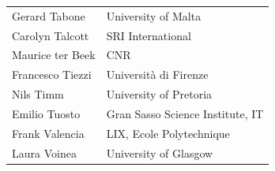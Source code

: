 \documentclass[]{llncs}
\begin{document}
\begin{longtable}{p{}p{}}
Gerard Tabone & University of Malta\\

Carolyn Talcott & SRI  International\\

Maurice ter Beek & CNR\\

Francesco Tiezzi & Universit\`a di Firenze\\

Nils Timm & University of Pretoria\\

Emilio Tuosto & Gran Sasso Science Institute, IT\\

Frank Valencia & LIX, Ecole Polytechnique\\

Laura Voinea & University of Glasgow\\

\end{longtable}
\end{document}
